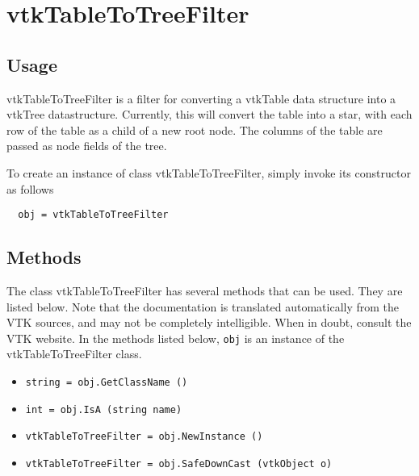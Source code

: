 \section{vtkTableToTreeFilter}

\subsection{Usage}


 vtkTableToTreeFilter is a filter for converting a vtkTable data structure
 into a vtkTree datastructure.  Currently, this will convert the table into
 a star, with each row of the table as a child of a new root node.
 The columns of the table are passed as node fields of the tree.

To create an instance of class vtkTableToTreeFilter, simply
invoke its constructor as follows
\begin{verbatim}
  obj = vtkTableToTreeFilter
\end{verbatim}
\subsection{Methods}

The class vtkTableToTreeFilter has several methods that can be used.
  They are listed below.
Note that the documentation is translated automatically from the VTK sources,
and may not be completely intelligible.  When in doubt, consult the VTK website.
In the methods listed below, \verb|obj| is an instance of the vtkTableToTreeFilter class.
\begin{itemize}
\item  \verb|string = obj.GetClassName ()|

\item  \verb|int = obj.IsA (string name)|

\item  \verb|vtkTableToTreeFilter = obj.NewInstance ()|

\item  \verb|vtkTableToTreeFilter = obj.SafeDownCast (vtkObject o)|

\end{itemize}

